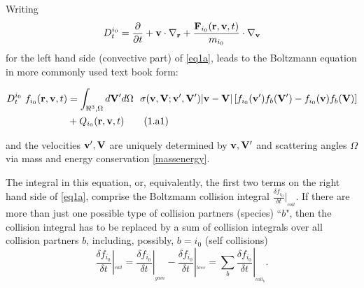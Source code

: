 Writing
\begin{equation}
  \nonumber D_t^{i_0} = \frac\partial{\partial t} + \mathbf{v}
  \cdot \nabla_{\mathbf{r}} + \frac{\mathbf{F}_{i_0}(\mathbf{r},\mathbf{v},t)}{m_{i_0}} \cdot \nabla_{\mathbf{v}}
\end{equation}
for the left hand side (convective part) of \cref{eq1a}, leads
to the Boltzmann equation in more commonly used text book form:

\begin{align}
  \label{eq1a1}\nonumber
  D_t^{i_0} \ f_{i_0}
  (\vr,\vvv,t) & = \int_{\Re^3,\Omega}  d\vV'd\Omega \ \ \sigma(\vvv,\vV;\vvv',\vV')
  |\vvv-\vV| \left[f_{i_0}(\vvv') f_b(\vV')- f_{i_0}(\vvv) f_b(\vV)\right] \nonumber
  \\
              & + Q_{i_0}
  (\vr,\vvv,t) \tag{1.a1}
\end{align}

and the velocities $\mathbf{v}',\mathbf{V} $ are uniquely determined by $\mathbf{v}, \mathbf{V}'$ and
scattering angles $\Omega$ via mass and energy conservation \cref{massenergy}.

The integral in this equation, or, equivalently, the first two terms on the
right hand side of \cref{eq1a}, comprise the Boltzmann collision integral
$\frac{\delta f_{i_0}}{\delta t}|_{_{coll}}$.
If there are more than just one possible type of collision partners (species)
``$b$", then the collision integral has to be replaced by a sum of collision
integrals over all collision partners $b$, including, possibly, $b=i_0$ (self
collisions)
\begin{equation}
  \label{collop} \frac{\delta f_{i_0}}{\delta
    t}|_{_{coll}}= \frac{\delta f_{i_0}}{\delta t}|_{_{gain}}- \frac{\delta
    f_{i_0}}{\delta t}|_{_{loss}}= \sum_b \frac{\delta f_{i_0}}{\delta
    t}|_{_{coll_b}}.
\end{equation}

